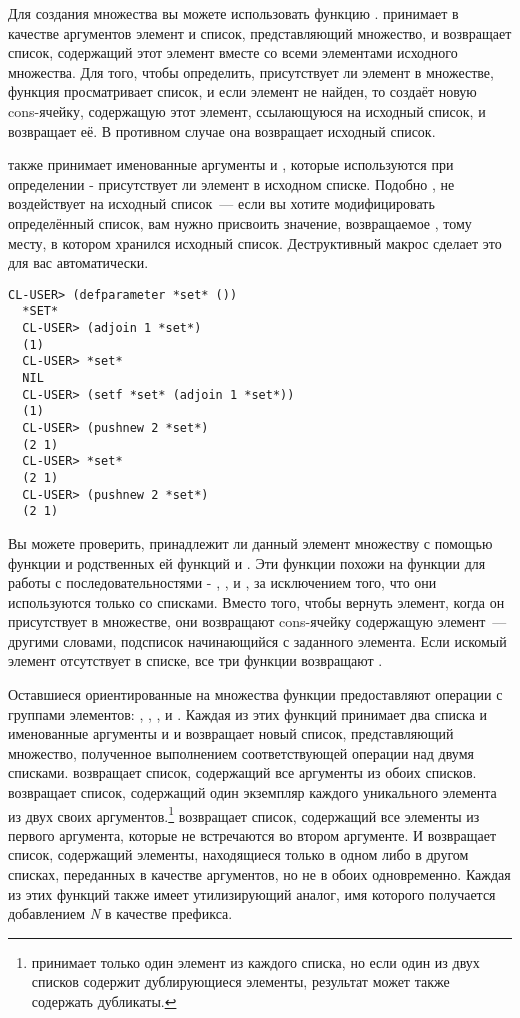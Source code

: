 Для создания множества вы можете использовать функцию . 
принимает в качестве аргументов элемент и список, представляющий множество, и возвращает
список, содержащий этот элемент вместе со всеми элементами исходного множества.  Для того,
чтобы определить, присутствует ли элемент в множестве, функция просматривает список, и
если элемент не найден, то  создаёт новую cons-ячейку, содержащую этот
элемент, ссылающуюся на исходный список, и возвращает её. В противном случае она
возвращает исходный список.

 также принимает именованные аргументы  и , которые
используются при определении - присутствует ли элемент в исходном списке. Подобно
,  не воздействует на исходный список~--- если вы хотите
модифицировать определённый список, вам нужно присвоить значение, возвращаемое
, тому месту, в котором хранился исходный список. Деструктивный макрос
 сделает это для вас автоматически.

\begin{lstlisting}[style=lisprepl]
  CL-USER> (defparameter *set* ())
  *SET*
  CL-USER> (adjoin 1 *set*)
  (1)
  CL-USER> *set*
  NIL
  CL-USER> (setf *set* (adjoin 1 *set*))
  (1)
  CL-USER> (pushnew 2 *set*)
  (2 1)
  CL-USER> *set*
  (2 1)
  CL-USER> (pushnew 2 *set*)
  (2 1)
\end{lstlisting}

Вы можете проверить, принадлежит ли данный элемент множеству с помощью функции
 и родственных ей функций  и . Эти
функции похожи на функции для работы с последовательностями - , ,
и , за исключением того, что они используются только со списками. Вместо
того, чтобы вернуть элемент, когда он присутствует в множестве, они возвращают cons-ячейку
содержащую элемент~--- другими словами, подсписок начинающийся с заданного элемента. Если
искомый элемент отсутствует в списке, все три функции возвращают .

Оставшиеся ориентированные на множества функции предоставляют операции с группами
элементов: , , , и
.  Каждая из этих функций принимает два списка и именованные
аргументы  и  и возвращает новый список, представляющий множество,
полученное выполнением соответствующей операции над двумя списками. 
возвращает список, содержащий все аргументы из обоих списков.  возвращает
список, содержащий один экземпляр каждого уникального элемента из двух своих
аргументов.\footnote{ принимает только один элемент из каждого списка, но если
  один из двух списков содержит дублирующиеся элементы, результат может также содержать
  дубликаты.}  возвращает список, содержащий все элементы из первого
аргумента, которые не встречаются во втором аргументе. И 
возвращает список, содержащий элементы, находящиеся только в одном либо в другом списках,
переданных в качестве аргументов, но не в обоих одновременно. Каждая из этих функций также
имеет утилизирующий аналог, имя которого получается добавлением \textit{N} в качестве
префикса.

